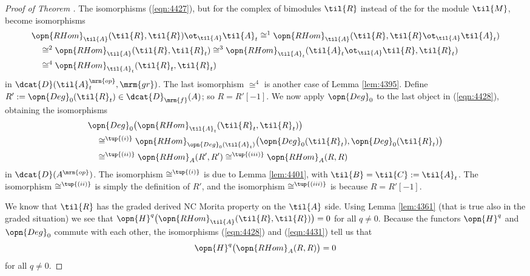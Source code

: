\begin{proof}[Proof of Theorem \tup{\ref{thm:4395}}]
The isomorphisms (\ref{eqn:4427}), but for the complex of bimodules $\til{R}$ 
instead of the for the module $\til{M}$, become isomorphisms 
\begin{equation} \label{eqn:4428}
\begin{aligned}
&
\opn{RHom}_{\til{A}}(\til{R}, \til{R}) \ot_{\til{A}} \til{A}_t
\cong^1 \opn{RHom}_{\til{A}}(\til{R}, \til{R} \ot_{\til{A}} \til{A}_t)
\\
& \quad 
\cong^2 \opn{RHom}_{\til{A}}(\til{R}, \til{R}_t)
\cong^3 \opn{RHom}_{\til{A}_t}(\til{A}_t \ot_{\til{A}} \til{R}, \til{R}_t)
\\
& \quad 
\cong^4 \opn{RHom}_{\til{A}_t}(\til{R}_t, \til{R}_t)
\end{aligned}
\end{equation}
in $\dcat{D}(\til{A}_t^{\mrm{op}}, \mrm{gr})$.
The last isomorphism $\cong^4$ is another case of Lemma \ref{lem:4395}.
Define 
$R' := \opn{Deg}_0(\til{R}_t) \in \dcat{D}_{\mrm{f}}(A)$;
so $R = R'[-1]$. 
We now apply $\opn{Deg}_0$ to the last object in (\ref{eqn:4428}), obtaining the
isomorphisms 
\begin{equation} \label{eqn:4431}
\begin{aligned}
&
\opn{Deg}_0 \bigl( \opn{RHom}_{\til{A}_t}(\til{R}_t, \til{R}_t) \bigr)
\\
& \quad 
\cong^{\tup{(i)}} \opn{RHom}_{\opn{Deg}_0(\til{A}_t)} 
\bigl( \opn{Deg}_0(\til{R}_t), \opn{Deg}_0(\til{R}_t) \bigr)
\\
& \quad 
\cong^{\tup{(ii)}} \opn{RHom}_{A}(R', R')
\cong^{\tup{(iii)}} \opn{RHom}_{A}(R, R)
\end{aligned}
\end{equation}
in $\dcat{D}(A^{\mrm{op}})$.
The isomorphism $\cong^{\tup{(i)}}$ is due to Lemma \ref{lem:4401}, with 
$\til{B} = \til{C}:= \til{A}_t$. 
The isomorphism $\cong^{\tup{(ii)}}$ is simply the definition of $R'$, and 
the isomorphism $\cong^{\tup{(iii)}}$ is because 
$R = R'[-1]$. 

We know that $\til{R}$ has the graded derived NC Morita property on the 
$\til{A}$ side. Using Lemma \ref{lem:4361} (that is true also in the graded 
situation) we see that \lb 
$\opn{H}^q \bigl( \opn{RHom}_{\til{A}}(\til{R}, \til{R}) \bigr) = 0$ 
for all $q \neq 0$. Because the functors $\opn{H}^q$ and $\opn{Deg}_0$ commute 
with each other, the isomorphisms (\ref{eqn:4428}) and (\ref{eqn:4431}) tell us 
that 
\begin{equation} \label{eqn:4433}
\opn{H}^q \bigl( \opn{RHom}_{A}(R, R) \bigr) = 0
\end{equation}
for all $q \neq 0$.


\end{proof}
